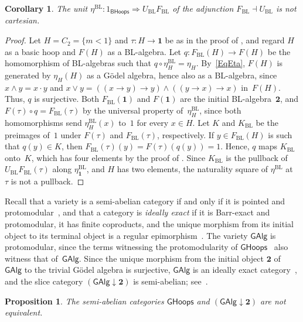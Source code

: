 \documentclass[reqno,a4paper]{amsart}
\theoremstyle{plain}
\newtheorem{proposition}[subsection]{Proposition}
\newtheorem{corollary}[subsection]{Corollary}
\theoremstyle{definition}
\theoremstyle{remark}
\numberwithin{equation}{section}
\newcommand{\two}{\mathbf{2}}
\newcommand{\GHoops}{\ensuremath{\mathsf{GHoops}}}
\newcommand{\GAlg}{\ensuremath{\mathsf{GAlg}}}
\newcommand{\BHoops}{\ensuremath{\mathsf{BHoops}}}
\newcommand{\one}{\mathbf{1}}
\begin{document}
\begin{corollary}\label{CorBL}
The unit $\eta^{\mathrm{BL}}\colon 1_{\BHoops}\Rightarrow U_{\mathrm{BL}}F_{\mathrm{BL}}$ of the adjunction $F_{\mathrm{BL}}\dashv U_{\mathrm{BL}}$ is not cartesian.
\end{corollary}

\begin{proof}
Let $H=C_2=\{m<1\}$ and $\tau\colon H\to\one$ be as in the proof of , and regard $H$ as a basic hoop and $F(H)$ as a BL-algebra. Let $q\colon F_{\mathrm{BL}}(H)\to F(H)$ be the homomorphism of BL-algebras such that $q\circ\eta^{\mathrm{BL}}_H=\eta_H$. By~\eqref{EqEta}, $F(H)$ is generated by $\eta_H(H)$ as a G\"odel algebra, hence also as a BL-algebra, since $x\wedge y=x\cdot y$ and $x\vee y=((x\to y)\to y)\wedge((y\to x)\to x)$ in~$F(H)$. Thus, $q$ is surjective. Both $F_{\mathrm{BL}}(\one)$ and $F(\one)$ are the initial BL-algebra~$\two$, and $F(\tau)\circ q=F_{\mathrm{BL}}(\tau)$ by the universal property of~$\eta^{\mathrm{BL}}_H$, since both homomorphisms send $\eta^{\mathrm{BL}}_H(x)$ to~$1$ for every $x\in H$. Let $K$ and $K_{\mathrm{BL}}$ be the preimages of~$1$ under $F(\tau)$ and $F_{\mathrm{BL}}(\tau)$, respectively. If $y\in F_{\mathrm{BL}}(H)$ is such that $q(y)\in K$, then $F_{\mathrm{BL}}(\tau)(y)=F(\tau)(q(y))=1$. Hence, $q$ maps $K_{\mathrm{BL}}$ onto~$K$, which has four elements by the proof of . Since $K_{\mathrm{BL}}$ is the pullback of $U_{\mathrm{BL}}F_{\mathrm{BL}}(\tau)$ along $\eta^{\mathrm{BL}}_{\one}$, and $H$ has two elements, the naturality square of $\eta^{\mathrm{BL}}$ at~$\tau$ is not a pullback.
\end{proof}

Recall that a variety is a semi-abelian category if and only if it is pointed and protomodular~\cite{BourJan,JMT}, and that a category is \emph{ideally exact} if it is Barr-exact and protomodular, it has finite coproducts, and the unique morphism from its initial object to its terminal object is a regular epimorphism~\cite{IdeallyExact}. The variety $\GAlg$ is protomodular, since the terms witnessing the protomodularity of $\GHoops$~\cite{BourJan,LMS} also witness that of~$\GAlg$. Since the unique morphism from the initial object $\two$ of $\GAlg$ to the trivial G\"odel algebra is surjective, $\GAlg$ is an ideally exact category~\cite{IdeallyExact}, and the slice category $(\GAlg\downarrow\two)$ is semi-abelian; see~\cite[Remark~3.3]{MMP}.

\begin{proposition}\label{PropNotEquivalent}
The semi-abelian categories $\GHoops$ and $(\GAlg\downarrow\two)$ are not equivalent.
\end{proposition}
\end{document}
